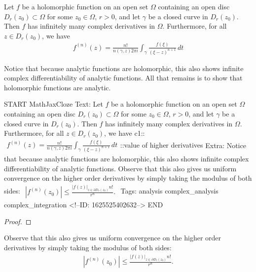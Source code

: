 \documentclass{memoir}
\begin{document}
\begin{cor}
	Let \(f\) be a holomorphic function on an open set \(\Omega \) containing an open disc \(D_r(z_0)\subset \Omega \) for some \(z_0 \in \Omega \), \(r>0\), and let \(\gamma \) be a closed curve in \(D_r(z_0)\). Then \(f\) has infinitely many complex derivatives in \(\Omega \). Furthermore, for all \(z \in D_r(z_0)\), we have
	\begin{align*}
		f^{(n)}(z) = \frac{n!}{n(\gamma,z)2\pi i} \int_\gamma \frac{f(\xi )}{(\xi  -z)^{n+1}}\,d t
	\end{align*}
\end{cor}

Notice that because analytic functions are holomorphic, this also shows infinite complex differentiability of analytic functions. All that remains is to show that holomorphic functions are analytic.

\begin{anki}
START
MathJaxCloze
Text: Let \(f\) be a holomorphic function on an open set \(\Omega \) containing an open disc \(D_r(z_0)\subset \Omega \) for some \(z_0 \in \Omega \), \(r>0\), and let \(\gamma \) be a closed curve in \(D_r(z_0)\). Then \(f\) has infinitely many complex derivatives in \(\Omega \). Furthermore, for all \(z \in D_r(z_0)\), we have
 {{c1::\(\begin{align*}
        	f^{(n)}(z) = \frac{n!}{n(\gamma,z)2\pi i} \int_\gamma \frac{f(\xi )}{(\xi  -z)^{n+1}}\,d t
        \end{align*}\)::value of higher derivatives}} 
Extra: Notice that because analytic functions are holomorphic, this also shows infinite complex differentiability of analytic functions.
Observe that this also gives us uniform convergence on the higher order derivatives by simply taking the modulus of both sides:
\(\begin{align*}
  	\left| f^{(n)}(z_0) \right| \leq \frac{\left| f(z) \right|_{z \in \partial D_r(z_0)} n!}{r^{n}}.
  \end{align*}\)
Tags: analysis complex_analysis complex_integration
<!--ID: 1625525402632-->
END
\end{anki}


\begin{proof}
	
\end{proof}

Observe that this also gives us uniform convergence on the higher order derivatives by simply taking the modulus of both sides:
\begin{align*}
	\left| f^{(n)}(z_0) \right| \leq \frac{\left| f(z) \right|_{z \in \partial D_r(z_0)} n!}{r^{n}}.
\end{align*}
\end{document}
